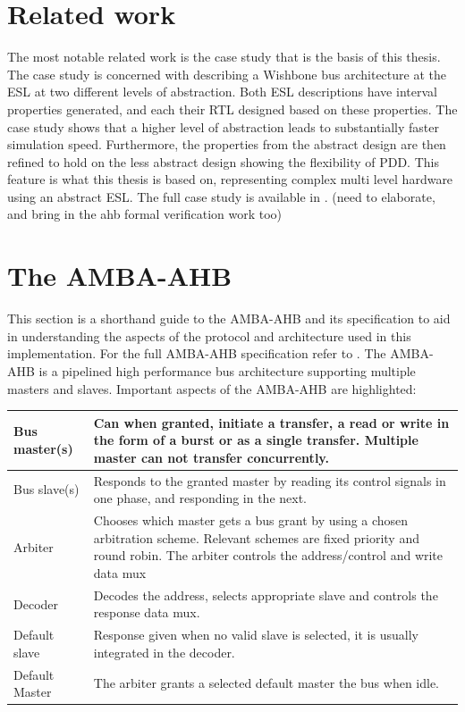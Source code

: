 \section{Related work}
\label{sec:related}
The most notable related work is the case study that is the basis of this thesis. 
The case study is concerned with describing a Wishbone bus architecture at the ESL at two different levels of abstraction. 
Both ESL descriptions have interval properties generated, and each their RTL designed based on these properties. 
The case study shows that a higher level of abstraction leads to substantially faster simulation speed. Furthermore, 
the properties from the abstract design are then refined to hold on the less abstract design showing the flexibility of PDD. 
This feature is what this thesis is based on, representing complex multi level hardware using an abstract ESL. The full case study is available in \cite{pddref}.
(need to elaborate, and bring in the ahb formal verification work too)

\section{The AMBA-AHB}
\label{sec:ahb}

This section is a shorthand guide to the AMBA-AHB and its specification to aid in understanding the aspects of the protocol and architecture used in this implementation. For the full AMBA-AHB specification refer to \cite{amba}. The AMBA-AHB is a pipelined high performance bus architecture supporting multiple masters and slaves. Important aspects of the AMBA-AHB are highlighted:

\begin{tabular}{p{3cm} p{10cm}}
Bus master(s) & Can when granted, initiate a transfer, a read or write in the form of a burst or as a single transfer. Multiple master can not transfer concurrently. \\
\hline
Bus slave(s) & Responds to the granted master by reading its control signals in one phase, and responding in the next. \\
\hline
Arbiter & Chooses which master gets a bus grant by using a chosen arbitration scheme. Relevant schemes are fixed priority and round robin. The arbiter controls the address/control and write data mux \\
\hline
Decoder & Decodes the address, selects appropriate slave and controls the response data mux. \\
\hline
Default slave & Response given when no valid slave is selected, it is usually integrated in the decoder.\\
\hline
Default Master & The arbiter grants a selected default master the bus when idle. \\
\end{tabular}


